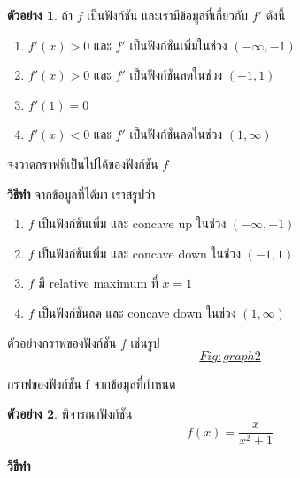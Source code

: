 \documentclass[
]{book}
\theoremstyle{definition}
\theoremstyle{definition}
\newtheorem{example}{ตัวอย่าง}[chapter]
\theoremstyle{definition}
\theoremstyle{definition}
\theoremstyle{remark}
\begin{document}
\begin{example}
ถ้า \(f\) เป็นฟังก์ชัน และเรามีข้อมูลที่เกี่ยวกับ \(f'\) ดังนี้

\begin{enumerate}
\def\labelenumi{\arabic{enumi}.}
\item
  \(f'(x) > 0\) และ \(f'\) เป็นฟังก์ชันเพิ่มในช่วง \((-\infty, -1)\)
\item
  \(f'(x) > 0\) และ \(f'\) เป็นฟังก์ชันลดในช่วง \((-1,1)\)
\item
  \(f'(1) = 0\)
\item
  \(f'(x) < 0\) และ \(f'\) เป็นฟังก์ชันลดในช่วง \((1,\infty)\)
\end{enumerate}

จงวาดกราฟที่เป็นไปได้ของฟังก์ชัน \(f\)
\end{example}

\textbf{วิธีทำ} จากข้อมูลที่ได้มา เราสรูปว่า

\begin{enumerate}
\def\labelenumi{\arabic{enumi}.}
\item
  \(f\) เป็นฟังก์ชันเพิ่ม และ concave up ในช่วง \((-\infty,-1)\)
\item
  \(f\) เป็นฟังก์ชันเพิ่ม และ concave down ในช่วง \((-1,1)\)
\item
  \(f\) มี relative maximum ที่ \(x=1\)
\item
  \(f\) เป็นฟังก์ชันลด และ concave down ในช่วง \((1,\infty)\)
\end{enumerate}

ตัวอย่างกราฟของฟังก์ชัน \(f\)
เช่นรูป~\hyperref[Fig:graph2]{\[Fig:graph2\]}

กราฟของฟังก์ชัน {f}
จากข้อมูลที่กำหนด

\begin{example}
พิจารณาฟังก์ชัน \[f(x) = \frac{x}{x^2+1}\]
\end{example}

\textbf{วิธีทำ}
\end{document}

